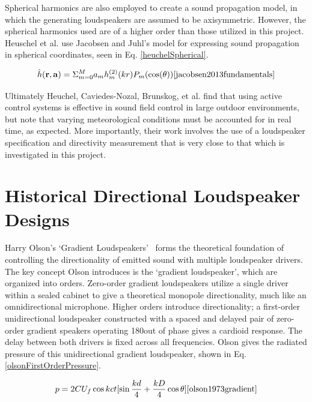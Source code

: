 \documentclass{report}
\newcommand{\matr}[1]{\mathbf{#1}} %
\begin{document}
        Spherical harmonics are also employed to create a sound propagation model, in which the generating loudspeakers are assumed to be axisymmetric.
        However, the spherical harmonics used are of a higher order than those utilized in this project. 
        Heuschel et al. use Jacobsen and Juhl's model for expressing sound propagation in spherical coordinates, seen in Eq. \ref{heuchelSpherical}.
        
        \begin{equation}
            \hat{h}(\matr{r},\matr{a}) = \Sigma_{m=0}^{M}a_m h_m^{(2)}(kr)P_m(\cos(\theta)) \cite{jacobsen2013fundamentals}
            \label{heuchelSpherical}
        \end{equation}

        Ultimately Heuchel, Caviedes-Nozal, Brunskog, et al. find that using active control systems is effective in sound field control in large outdoor environments, but note that varying meteorological conditions must be accounted for in real time, as expected.
        More importantly, their work involves the use of a loudspeaker specification and directivity measurement that is very close to that which is investigated in this project.

    \section{Historical Directional Loudspeaker Designs}

        Harry Olson's `Gradient Loudspeakers'~\cite{olson1973gradient} forms the theoretical foundation of controlling the directionality of emitted sound with multiple loudspeaker drivers.
        The key concept Olson introduces is the `gradient loudspeaker', which are organized into orders.
        Zero-order gradient loudspeakers utilize a single driver within a sealed cabinet to give a theoretical monopole directionality, much like an omnidirectional microphone.
        Higher orders introduce directionality; a first-order unidirectional loudspeaker constructed with a spaced and delayed pair of zero-order gradient speakers operating 180\degree\@ out of phase gives a cardioid response.
        The delay between both drivers is fixed across all frequencies.
        Olson gives the radiated pressure of this unidirectional gradient loudspeaker, shown in Eq.\ref{olsonFirstOrderPressure}.

        \begin{equation}
            p = 2CU_f\cos{kct}[\sin{\frac{kd}{4}+\frac{kD}{4}\cos{\theta}}]
            \label{olsonFirstOrderPressure}
            \cite{olson1973gradient}
        \end{equation}
\end{document}
